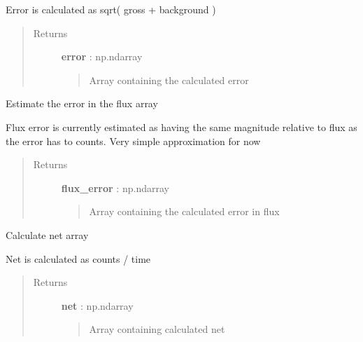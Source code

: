 \documentclass[letterpaper,10pt,english]{sphinxmanual}
\begin{document}
\begin{fulllineitems}
\begin{fulllineitems}
Error is calculated as sqrt( gross + background )
\begin{quote}\begin{description}
\item[{Returns }] \leavevmode
\textbf{error} : np.ndarray
\begin{quote}

Array containing the calculated error
\end{quote}

\end{description}\end{quote}

\end{fulllineitems}


\begin{fulllineitems}
\label{index:lightcurve.lightcurve.LightCurve.flux_error}
Estimate the error in the flux array

Flux error is currently estimated as having the same magnitude
relative to flux as the error has to counts.  Very simple approximation
for now
\begin{quote}\begin{description}
\item[{Returns }] \leavevmode
\textbf{flux\_error} : np.ndarray
\begin{quote}

Array containing the calculated error in flux
\end{quote}

\end{description}\end{quote}

\end{fulllineitems}


\begin{fulllineitems}
\label{index:lightcurve.lightcurve.LightCurve.net}
Calculate net array

Net is calculated as counts / time
\begin{quote}\begin{description}
\item[{Returns }] \leavevmode
\textbf{net} : np.ndarray
\begin{quote}

Array containing calculated net
\end{quote}


\end{description}
\end{quote}
\end{fulllineitems}
\end{fulllineitems}
\end{document}

